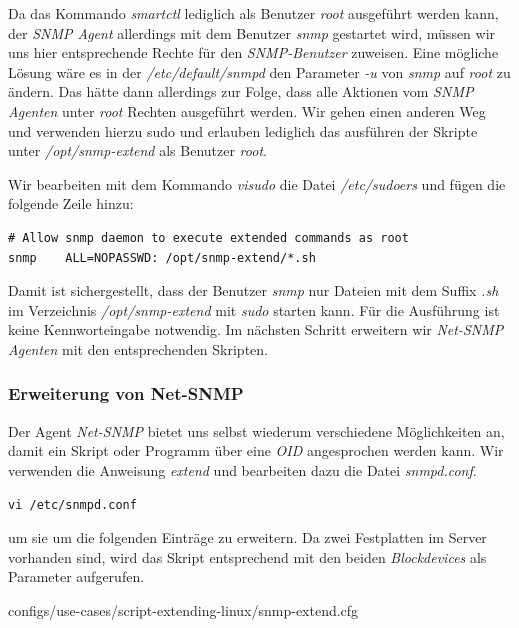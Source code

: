 Da das Kommando \emph{smartctl} lediglich als Benutzer \emph{root} ausgeführt werden kann, der \emph{SNMP Agent} allerdings mit dem Benutzer \emph{snmp} gestartet wird, müssen wir uns hier entsprechende Rechte für den \emph{SNMP-Benutzer} zuweisen. Eine mögliche Lösung wäre es in der \emph{/etc/default/snmpd} den Parameter \emph{-u} von \emph{snmp} auf \emph{root} zu ändern. Das hätte dann allerdings zur Folge, dass alle Aktionen vom \emph{SNMP Agenten} unter \emph{root} Rechten ausgeführt werden. Wir gehen einen anderen Weg und verwenden hierzu sudo und erlauben lediglich das ausführen der Skripte unter \emph{/opt/snmp-extend} als Benutzer \emph{root}.

Wir bearbeiten mit dem Kommando \emph{visudo} die Datei \emph{/etc/sudoers} und fügen die folgende Zeile hinzu:

\begin{lstlisting}[numbers=none]
# Allow snmp daemon to execute extended commands as root
snmp    ALL=NOPASSWD: /opt/snmp-extend/*.sh
\end{lstlisting}

Damit ist sichergestellt, dass der Benutzer \emph{snmp} nur Dateien mit dem Suffix \emph{.sh} im Verzeichnis \emph{/opt/snmp-extend} mit \emph{sudo} starten kann. Für die Ausführung ist keine Kennworteingabe notwendig. Im nächsten Schritt erweitern wir \emph{Net-SNMP Agenten} mit den entsprechenden Skripten.

\subsubsection{Erweiterung von Net-SNMP}
Der Agent \emph{Net-SNMP} bietet uns selbst wiederum verschiedene Möglichkeiten an, damit ein Skript oder Programm über eine \emph{OID} angesprochen werden kann. Wir verwenden die Anweisung \emph{extend} und bearbeiten dazu die Datei \emph{snmpd.conf}.

\begin{lstlisting}[numbers=none]
vi /etc/snmpd.conf
\end{lstlisting}

um sie um die folgenden Einträge zu erweitern. Da zwei Festplatten im Server vorhanden sind, wird das Skript entsprechend mit den beiden \emph{Blockdevices} als Parameter aufgerufen.


  {configs/use-cases/script-extending-linux/snmp-extend.cfg}

